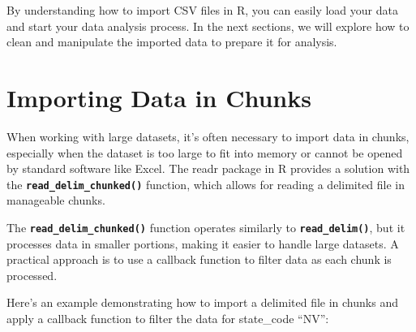 \documentclass[
]{book}
\begin{document}
By understanding how to import CSV files in R, you can easily load your data and start your data analysis process. In the next sections, we will explore how to clean and manipulate the imported data to prepare it for analysis.

\newpage

\hypertarget{importing-data-in-chunks}{%
\section{Importing Data in Chunks}\label{importing-data-in-chunks}}

When working with large datasets, it's often necessary to import data in chunks, especially when the dataset is too large to fit into memory or cannot be opened by standard software like Excel. The readr package in R provides a solution with the \textbf{\texttt{read\_delim\_chunked()}} function, which allows for reading a delimited file in manageable chunks.

The \textbf{\texttt{read\_delim\_chunked()}} function operates similarly to \textbf{\texttt{read\_delim()}}, but it processes data in smaller portions, making it easier to handle large datasets. A practical approach is to use a callback function to filter data as each chunk is processed.

Here's an example demonstrating how to import a delimited file in chunks and apply a callback function to filter the data for state\_code ``NV'':
\end{document}
